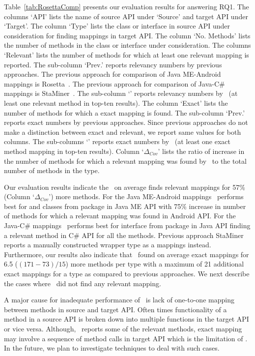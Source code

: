 Table~\ref{tab:RosettaComp} presents our evaluation results for answering RQ1. 
The columns `API' lists the name of source API under `Source' and target API under `Target'. 
The column `Type' lists the class or interface in source API
under consideration for finding mappings in target API.
The column `No. Methods' lists the number of methods in the class or interface under consideration.
The columns `Relevant' lists the number of methods for which at least one relevant mapping is reported.
The sub-column `Prev.' reports relevancy numbers by previous approaches.
The previous approach for comparison of Java ME-Android mappings is Rosetta~\cite{Gokhale2013ICSE}.
The previous approach for comparison of Java-C\# mappings is StaMiner~\cite{nguyen2014statistical}.
The sub-column `\tool' reports relevancy numbers by \tool\ (at least one relevant method in top-ten results).
The column `Exact' lists the number of methods for which a exact mapping is found.
The sub-column `Prev.' reports exact numbers by previous approaches.
Since previous approaches do not make a distinction between exact and relevant, we report same values for both columns.
The sub-columns `\tool' reports exact numbers by \tool\ (at least one exact method mapping in top-ten results).
Column `$\Delta_{Cov}$' lists the ratio of increase in the number of methods for which a relevant mapping was found by \tool\ to the total number of methods in the type.


Our evaluation results indicate the \tool\ on average finds relevant mappings for 57\% (Column `$\Delta_{Cov}$') more methods. 
For the Java ME-Android mappings \tool\ performs best for 
and  classes from  
package in Java ME API with 75\% increase in number of methods
for which a relevant mapping was found in Android API.
For the Java-C\# mappings \tool\ performs best for  interface from  package in Java API
finding a relevant method in C\# API for all the methods.
Previous approach StaMiner reports a manually constructed wrapper type as a mappings instead.
Furthermore, our results also indicate that \tool\ found on average exact mappings for 6.5 ($(171-73)/15$) more methods per type with a maximum of 21 additional exact mappings for a  type as compared to previous approaches.
We next describe the cases where \tool\ did not find any relevant mapping.

A major cause for inadequate performance of \tool\ is 
lack of one-to-one mapping between methods in source and target API.
Often times functionality of a method in a source API 
is broken down into multiple functions in the target API or vice versa.
Although, \tool\ reports some of the relevant methods, exact mapping may involve a sequence of method calls in target API which is the limitation of \tool.
In the future, we plan to investigate techniques to deal with such cases.


